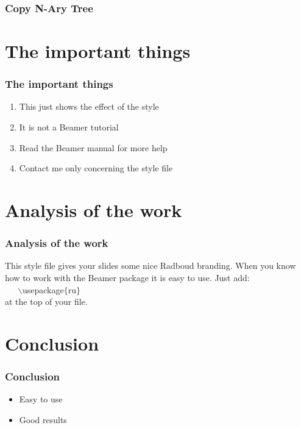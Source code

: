 \documentclass{beamer}
\begin{document}
\begin{frame}
	\frametitle{Copy N-Ary Tree}
	 \begin{algorithmic}[1]
		 \tiny
		 	\State {}
		 \Else
			\State {}
		 \EndIf
	 \end{algorithmic}
\end{frame}
\section{The important things}

\begin{frame}
	\frametitle{The important things}

	\begin{enumerate}
	        \item This just shows the effect of the style
		\item It is not a Beamer tutorial
		\item Read the Beamer manual for more help
		\item Contact me only concerning the style file
	\end{enumerate}
\end{frame}

\section{Analysis of the work}

\begin{frame}
	  \frametitle{Analysis of the work}

	    This style file gives your slides some nice Radboud branding.
	    When you know how to work with the Beamer package it is easy to use.
	    Just add:\\ ~~~$\backslash$usepackage$\{$ru$\}$ \\ at the top of your file.
\end{frame}

\section{Conclusion}

\begin{frame}
	  \frametitle{Conclusion}

	  \begin{itemize}
	  	\item Easy to use
		\item Good results
	  \end{itemize}
\end{frame}
\end{document}
